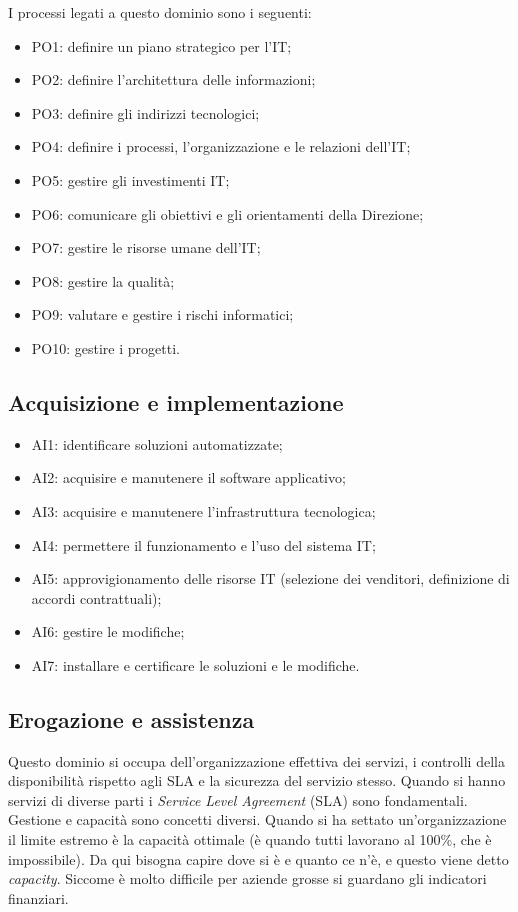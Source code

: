 I processi legati a questo dominio sono i seguenti:

\begin{itemize}
\item PO1: definire un piano strategico per l'IT;
\item PO2: definire l'architettura delle informazioni;
\item PO3: definire gli indirizzi tecnologici;
\item PO4: definire i processi, l'organizzazione e le relazioni dell'IT;
\item PO5: gestire gli investimenti IT;
\item PO6: comunicare gli obiettivi e gli orientamenti della Direzione;
\item PO7: gestire le risorse umane dell'IT;
\item PO8: gestire la qualità;
\item PO9: valutare e gestire i rischi informatici;
\item PO10: gestire i progetti.

\end{itemize}

\subsection{Acquisizione e implementazione}

\begin{itemize}
\item AI1: identificare soluzioni automatizzate;
\item AI2: acquisire e manutenere il software applicativo;
\item AI3: acquisire e manutenere l'infrastruttura tecnologica;
\item AI4: permettere il funzionamento e l'uso del sistema IT;
\item AI5: approvigionamento delle risorse IT (selezione dei venditori,
definizione di accordi contrattuali);
\item AI6: gestire le modifiche;
\item AI7: installare e certificare le soluzioni e le modifiche.
\end{itemize}

\subsection{Erogazione e assistenza}

Questo dominio si occupa dell'organizzazione effettiva dei servizi,
i controlli della disponibilità rispetto agli SLA e la sicurezza del
servizio stesso.
Quando si hanno servizi di diverse parti i \textit{Service Level
Agreement} (SLA) sono fondamentali. Gestione e capacità sono concetti diversi.
Quando si ha settato un'organizzazione il limite estremo è la capacità
ottimale (è quando tutti lavorano al 100\%, che è impossibile). Da qui bisogna
capire dove si è e quanto ce n'è, e questo viene detto \textit{capacity}.
Siccome è molto difficile per aziende grosse si guardano gli indicatori
finanziari.
